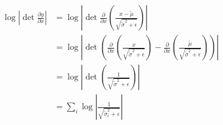 \documentclass{article}
\begin{document}
\begin{align*}
\log\left| \det\frac{\partial y}{\partial x} \right| &= \log\left| \det\frac{\partial }{\partial x}\left(\frac{x - \tilde{\mu}}{\sqrt{\tilde{\sigma}^{2} + \epsilon}}\right) \right| \\
&= \log\left| \det \left( \frac{\partial }{\partial x}\left(\frac{x }{\sqrt{\tilde{\sigma}^{2} + \epsilon}}\right) - \frac{\partial }{\partial x}\left(\frac{\tilde{\mu} }{\sqrt{\tilde{\sigma}^{2} + \epsilon}}\right) \right) \right| \\
&= \log\left| \det \left( \frac{1}{\sqrt{\tilde{\sigma}^{2} + \epsilon}} \right) \right| \\
&= \sum_{i}\log \left| \frac{1}{\sqrt{\tilde{\sigma}_{i}^{2} + \epsilon}}  \right| \\
\end{align*}
\end{document}
